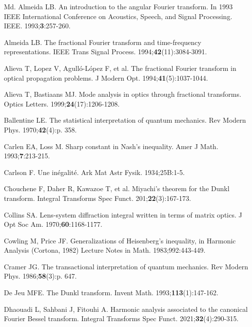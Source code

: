 \documentclass[12pt,a4paper,reqno]{amsproc}
\theoremstyle{definition}
\theoremstyle{remark}
\numberwithin{equation}{section}
\begin{document}
\begin{thebibliography}{Md.}
 Almeida LB. An introduction to the angular Fourier transform. In 1993 IEEE International Conference on Acoustics, Speech, and Signal Processing. IEEE. 1993;\textbf{3}:257-260.

  Almeida LB. The fractional Fourier transform and time-frequency representations. IEEE Trans Signal Process. 1994;\textbf{42}(11):3084-3091.

   Alieva T,  Lopez V,   Agull{\'o}-L\'opez F, et al.  The fractional Fourier transform in optical propagation problems. J Modern Opt. 1994;\textbf{41}(5):1037-1044.
 
 Alieva T, Bastiaans MJ.  Mode analysis in optics through fractional transforms. Optics Letters. 1999;\textbf{24}(17):1206-1208.

 Ballentine LE. The statistical interpretation of quantum mechanics. Rev Modern Phys. 1970;\textbf{42}(4):p. 358.

 Carlen EA,  Loss M. Sharp constant in Nash’s inequality. Amer J Math. 1993;\textbf{7}:213-215.

Carlson F. Une in\'egalit\'e. Ark Mat Astr Fysik. 1934;25B:1-5.

 Chouchene F,   Daher R,  Kawazoe T, et al. Miyachi's theorem for the Dunkl transform.  Integral Transforms Spec Funct. 201;{\bf{22}}(3):167-173.

  Collins SA. Lens-system diffraction integral written in terms of matrix optics. J Opt Soc Am. 1970;\textbf{60}:1168-1177.

 Cowling M,   Price JF. Generalizations of Heisenberg’s inequality, in Harmonic Analysis (Cortona, 1982) Lecture Notes in Math. 1983;992:443-449.

 Cramer  JG. The transactional interpretation of quantum mechanics. Rev Modern Phys. 1986;\textbf{58}(3):p. 647.

 De Jeu MFE. The Dunkl transform. Invent Math. 1993;{\bf{113}}(1):147-162.

 Dhaouadi L,   Sahbani J,  Fitouhi A.  Harmonic analysis associated to the canonical Fourier Bessel transform. Integral Transforms Spec Funct. 2021;\textbf{32}(4):290-315.


\end{thebibliography}
\end{document}
